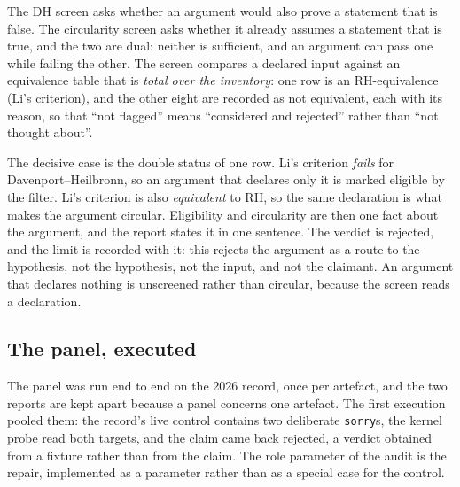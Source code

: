\documentclass[11pt,a4paper]{article}
\newcommand{\RH}{\mathrm{RH}}
\newcommand{\DHf}{\mathrm{DH}}
\newcommand{\verdict}[1]{\textsf{#1}}
\begin{document}
The $\DHf$ screen asks whether an argument would also prove a statement that is false. The
circularity screen asks whether it already assumes a statement that is true, and the two are
dual: neither is sufficient, and an argument can pass one while failing the
other. The screen compares a declared input against an equivalence table that is \emph{total
over the inventory}: one row is an $\RH$-equivalence (Li's criterion), and the other eight are
recorded as not equivalent, each with its reason, so that ``not flagged'' means ``considered
and rejected'' rather than ``not thought about''.

The decisive case is the double status of one row. Li's criterion \emph{fails} for Davenport--Heilbronn, so an argument that declares only
it is marked \verdict{eligible} by the filter. Li's criterion is also \emph{equivalent} to $\RH$, so
the same declaration is what makes the argument circular. Eligibility and circularity are then one
fact about the argument, and the report states it in one sentence. The verdict is
\verdict{rejected}, and the limit is recorded with it: this rejects the argument as a route to the
hypothesis, not the hypothesis, not the input, and not the claimant. An argument that declares
nothing is unscreened rather than circular, because the screen reads a declaration.

\subsection{The panel, executed}

The panel was run end to end on the 2026 record, once per artefact, and the two reports
are kept apart because a panel concerns one artefact. The first execution pooled them: the record's
live control contains two deliberate \texttt{sorry}s, the kernel probe read both targets, and the
claim came back \verdict{rejected}, a verdict obtained from a fixture rather than from the claim.
The role parameter of the audit is the repair, implemented as a parameter rather than as a special
case for the control.
\end{document}
